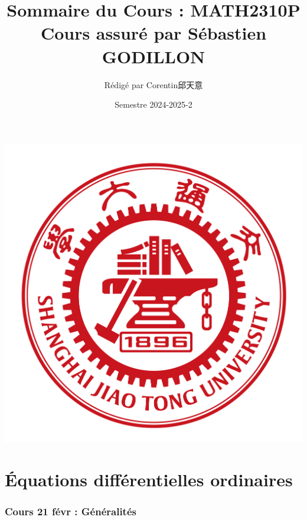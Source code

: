 \documentclass{article}
\title{\textbf{Sommaire du Cours : MATH2310P} \\ Cours assuré par Sébastien GODILLON}
\author{Rédigé par Corentin邱天意}
\date{Semestre 2024-2025-2}
\begin{document}
\maketitle

\centerline{\includegraphics[scale=0.4]{sjtu}}



\newpage
\tableofcontents

\newpage

\part{Équations différentielles ordinaires}
\section{Cours 21 févr : Généralités}
\end{document}
